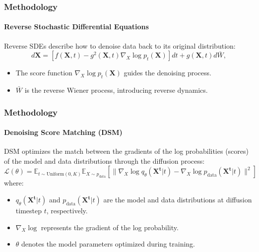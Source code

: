 \documentclass[light]{lutbeamer} %
\begin{document}
\begin{frame}
    \frametitle{Methodology}
    \framesubtitle{Reverse Stochastic Differential Equations}

    Reverse SDEs describe how to denoise data back to its original distribution:
    \begin{equation}
        d\mathbf{X} = \left[f(\mathbf{X}, t) - g^2(\mathbf{X}, t)\nabla_X \log p_t(\mathbf{X})\right]dt + g(\mathbf{X}, t)d\bar{W},
    \end{equation}
    \begin{itemize}
        \item The score function \(\nabla_X \log p_t(\mathbf{X})\) guides the denoising process.
        \item \(\bar{W}\) is the reverse Wiener process, introducing reverse dynamics.
    \end{itemize}
\end{frame}

\begin{frame}
    \frametitle{Methodology}
    \framesubtitle{Denoising Score Matching (DSM)}

    DSM optimizes the match between the gradients of the log probabilities (scores) of the model and data distributions through the diffusion process:
    \begin{equation}
        \mathcal{L}(\theta) = \mathbb{E}_{t \sim \text{Uniform}(0, K)} \mathbb{E}_{X \sim p_{\text{data}}} [\|\nabla_X \log q_{\theta}(\mathbf{X^t} | t) - \nabla_X \log p_{\text{data}}(\mathbf{X^t} | t)\|^2]
    \end{equation}
    where:
    \begin{itemize}
        \item \( q_{\theta}(\mathbf{X^t} | t) \) and \( p_{\text{data}}(\mathbf{X^t} | t) \) are the model and data distributions at diffusion timestep \(t\), respectively.
        \item \( \nabla_X \log \) represents the gradient of the log probability.
        \item \( \theta \) denotes the model parameters optimized during training.
    \end{itemize}
\end{frame}
\end{document}
